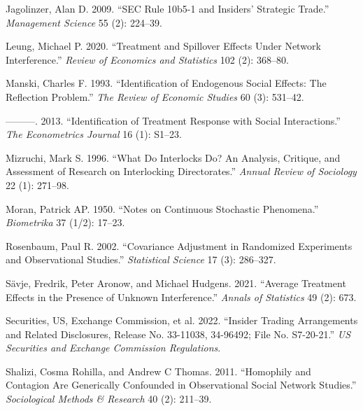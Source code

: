 \documentclass[
  a4paper,
]{article}
\newlength{\cslhangindent}
\newenvironment{CSLReferences}[2] %
 {\begin{list}{}{%
  \setlength{\itemindent}{0pt}
  \setlength{\leftmargin}{0pt}
  \setlength{\parsep}{0pt}
  \ifodd #1
   \setlength{\leftmargin}{\cslhangindent}
   \setlength{\itemindent}{-1\cslhangindent}
  \fi
  \setlength{\itemsep}{#2\baselineskip}}}
 {\end{list}}
\begin{document}
\begin{CSLReferences}{1}{0}
Jagolinzer, Alan D. 2009. {``SEC Rule 10b5-1 and Insiders' Strategic
Trade.''} \emph{Management Science} 55 (2): 224--39.

Leung, Michael P. 2020. {``Treatment and Spillover Effects Under Network
Interference.''} \emph{Review of Economics and Statistics} 102 (2):
368--80.

Manski, Charles F. 1993. {``Identification of Endogenous Social Effects:
The Reflection Problem.''} \emph{The Review of Economic Studies} 60 (3):
531--42.

---------. 2013. {``Identification of Treatment Response with Social
Interactions.''} \emph{The Econometrics Journal} 16 (1): S1--23.

Mizruchi, Mark S. 1996. {``What Do Interlocks Do? An Analysis, Critique,
and Assessment of Research on Interlocking Directorates.''} \emph{Annual
Review of Sociology} 22 (1): 271--98.

Moran, Patrick AP. 1950. {``Notes on Continuous Stochastic Phenomena.''}
\emph{Biometrika} 37 (1/2): 17--23.

Rosenbaum, Paul R. 2002. {``Covariance Adjustment in Randomized
Experiments and Observational Studies.''} \emph{Statistical Science} 17
(3): 286--327.

Sävje, Fredrik, Peter Aronow, and Michael Hudgens. 2021. {``Average
Treatment Effects in the Presence of Unknown Interference.''}
\emph{Annals of Statistics} 49 (2): 673.

Securities, US, Exchange Commission, et al. 2022. {``Insider Trading
Arrangements and Related Disclosures, Release No. 33-11038, 34-96492;
File No. S7-20-21.''} \emph{US Securities and Exchange Commission
Regulations}.

Shalizi, Cosma Rohilla, and Andrew C Thomas. 2011. {``Homophily and
Contagion Are Generically Confounded in Observational Social Network
Studies.''} \emph{Sociological Methods \& Research} 40 (2): 211--39.

\end{CSLReferences}
\end{document}
